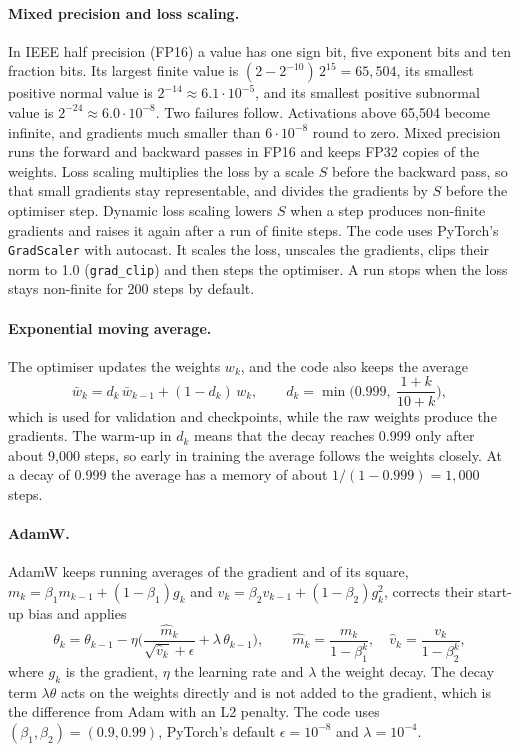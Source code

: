 \paragraph{Mixed precision and loss scaling.} In IEEE half precision (FP16) a value has one sign bit, five exponent bits and ten fraction bits. Its largest finite value is $(2-2^{-10})\,2^{15}=65{,}504$, its smallest positive normal value is $2^{-14}\approx6.1\cdot10^{-5}$, and its smallest positive subnormal value is $2^{-24}\approx6.0\cdot10^{-8}$. Two failures follow. Activations above 65{,}504 become infinite, and gradients much smaller than $6\cdot10^{-8}$ round to zero. Mixed precision \cite{micikevicius2018mixed} runs the forward and backward passes in FP16 and keeps FP32 copies of the weights. Loss scaling multiplies the loss by a scale $S$ before the backward pass, so that small gradients stay representable, and divides the gradients by $S$ before the optimiser step. Dynamic loss scaling lowers $S$ when a step produces non-finite gradients and raises it again after a run of finite steps. The code uses PyTorch's \texttt{GradScaler} with autocast. It scales the loss, unscales the gradients, clips their norm to 1.0 (\texttt{grad\_clip}) and then steps the optimiser. A run stops when the loss stays non-finite for 200 steps by default.

\paragraph{Exponential moving average.} The optimiser updates the weights $w_k$, and the code also keeps the average
\begin{equation}
\bar w_k=d_k\,\bar w_{k-1}+(1-d_k)\,w_k,\qquad d_k=\min\!\Big(0.999,\ \frac{1+k}{10+k}\Big),\label{eq:bg-ema}
\end{equation}
which is used for validation and checkpoints, while the raw weights produce the gradients. The warm-up in $d_k$ means that the decay reaches 0.999 only after about 9{,}000 steps, so early in training the average follows the weights closely. At a decay of 0.999 the average has a memory of about $1/(1-0.999)=1{,}000$ steps.

\paragraph{AdamW.} AdamW \cite{loshchilov2019adamw} keeps running averages of the gradient and of its square, $m_k=\beta_1 m_{k-1}+(1-\beta_1)g_k$ and $v_k=\beta_2 v_{k-1}+(1-\beta_2)g_k^2$, corrects their start-up bias and applies
\begin{equation}
\theta_k=\theta_{k-1}-\eta\Big(\frac{\hat m_k}{\sqrt{\hat v_k}+\epsilon}+\lambda\,\theta_{k-1}\Big),\qquad \hat m_k=\frac{m_k}{1-\beta_1^k},\quad \hat v_k=\frac{v_k}{1-\beta_2^k},\label{eq:bg-adamw}
\end{equation}
where $g_k$ is the gradient, $\eta$ the learning rate and $\lambda$ the weight decay. The decay term $\lambda\theta$ acts on the weights directly and is not added to the gradient, which is the difference from Adam with an L2 penalty. The code uses $(\beta_1,\beta_2)=(0.9,0.99)$, PyTorch's default $\epsilon=10^{-8}$ and $\lambda=10^{-4}$.

